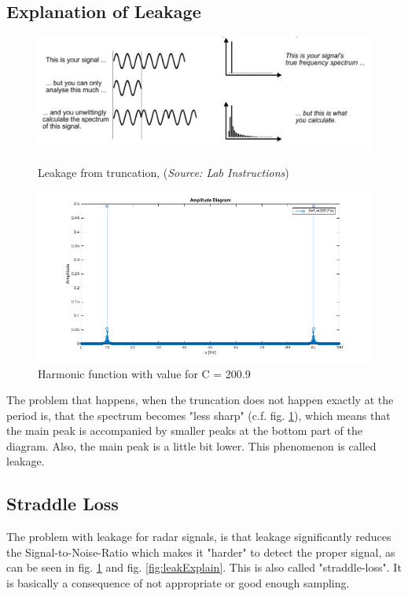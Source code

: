 \documentclass[12pt]{article}
\begin{document}
\subsection{Explanation of Leakage}
\begin{figure}[!htbp]
  \centering
  \begin{minipage}[b]{0.9\textwidth}
    \includegraphics[width=\textwidth]{images/figure_straddleloss}
    \caption{Leakage from truncation, (\textit{Source: Lab Instructions})}
    \label{fig:leakExplain}
  \end{minipage}
  \vfill
  \begin{minipage}[b]{0.9\textwidth}
    \includegraphics[width=\textwidth]{images/ass1_5}
    \caption{Harmonic function with value for C = 200.9}
    \label{fig:leak}
  \end{minipage}
\end{figure}

The problem that happens, when the truncation does not happen exactly at the period is, that the spectrum becomes "less sharp" (c.f. fig. \ref{fig:leak}), which means that the main peak is accompanied by smaller peaks at the bottom part of the diagram. Also, the main peak is a little bit lower. This phenomenon is called leakage.

\subsection{Straddle Loss}
The problem with leakage for radar signals, is that leakage significantly reduces the Signal-to-Noise-Ratio which makes it "harder" to detect the proper signal, as can be seen in fig. \ref{fig:leak} and fig. \ref{fig:leakExplain}. This is also called "straddle-loss". It is basically a consequence of not appropriate or good enough sampling.
\end{document}
